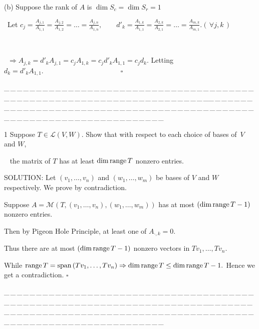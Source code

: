 \documentclass[a4paper, 11pt, UTF8]{article}
\def\range{\textup{range}\,}
\def\Spn{\textup{span}\,}
\def\Lm{\mathcal{L}}
\def\Mt{\mathcal{M}}
\begin{document}
\begin{large}
(b) Suppose the rank of $A$ is $\dim S_c=\dim S_r=1$ \par\qquad\,
Let $c_j=\displaystyle\frac{A_{j,1}}{A_{1,1}}=\frac{A_{j,2}}{A_{1,2}}=\dots=\frac{A_{j,n}}{A_{1,n}},\qquad d'_k=\frac{A_{1,k}}{A_{1,1}}=\frac{A_{2,k}}{A_{2,1}}=\dots=\frac{A_{m,k}}{A_{m,1}}$.\quad$(\,\forall j,k\,)$\par{\tiny{\,}\par}\qquad\,
$\Rightarrow A_{j,k}=d'_k A_{j,1}=c_j A_{1,k}=c_j d'_k A_{1,1}=c_j d_k.$ Letting $d_k=d'_k A_{1,1}.\qquad\qquad\qquad\qquad\qquad\quad\square$
\par
{\tiny \_\,\_\,\_\,\_\,\_\,\_\,\_\,\_\,\_\,\_\,\_\,\_\,\_\,\_\,\_\,\_\,\_\,\_\,\_\,\_\,\_\,\_\,\_\,\_\,\_\,\_\,\_\,\_\,\_\,\_\,\_\,\_\,\_\,\_\,\_\,\_\,\_\,\_\,\_\,\_\,\_\,\_\,\_\,\_\,\_\,\_\,\_\,\_\,\_\,\_\,\_\,\_\,\_\,\_\,\_\,\_\,\_\,\_\,\_\,\_\,\_\,\_\,\_\,\_\,\_\,\_\,\_\,\_\,\_\,\_\,\_\_\,\_\,\_\,\_\,\_\,\_\,\_\,\_\,\_\,\_\,\_\,\_\,\_\,\_\,\_\,\_\,\_\,\_\,\_\,\_\,\_\,\_\,\_\,\_\,\_\,\_\,\_\,\_\,\_\,\_\,\_\,\_\,\_\,\_\,\_\,\_\,\_\,\_\,\_\,\_\,\_\,\_\,\_\,\_\,\_\,\_\,\_\,\_\,\_\,\_\,\_\,\_\,\_\,\_\,\_\,\_\,\_\,\_\,\_\,\_\,\_\,\_\,\_\,\_\,\_\,\_\,\_\,\_\,\_\,\_\,\_}\par

{\timesbf\Large 1} {\timessl\Large 
Suppose $T\in\Lm(V, W)$. Show that with respect to each choice of bases of \,$V$ and $W$,}\par\,\,\,
{\timessl\Large the matrix of $T$ has at least $\dim\range T$ nonzero entries.
}\par
{\timesbf S\footnotesize{OLUTION:}} Let $(v_1,\dots,v_n)$ and $(w_1,\dots,w_m)$ be bases of $V$ and $W$ respectively. We prove by contradiction.\par\quad
Suppose $A=\Mt(T,(v_1,\dots,v_n),(w_1,\dots,w_m))$ has at most $(\dim\range T-1)$ nonzero entries.\par\quad
Then by Pigeon Hole Principle, at least one of $A_{\cdot,k}=0$.\par\quad
Thus there are at most $(\dim\range T-1)$ nonzero vectors in $Tv_1,\dots,Tv_n$.\par\quad
While $\range T=\Spn(Tv_1,\dots,Tv_n)\Rightarrow\dim\range T\leq \dim\range T-1.$ Hence we get a contradiction.$\,\,\square$
\par
{\tiny \_\,\_\,\_\,\_\,\_\,\_\,\_\,\_\,\_\,\_\,\_\,\_\,\_\,\_\,\_\,\_\,\_\,\_\,\_\,\_\,\_\,\_\,\_\,\_\,\_\,\_\,\_\,\_\,\_\,\_\,\_\,\_\,\_\,\_\,\_\,\_\,\_\,\_\,\_\,\_\,\_\,\_\,\_\,\_\,\_\,\_\,\_\,\_\,\_\,\_\,\_\,\_\,\_\,\_\,\_\,\_\,\_\,\_\,\_\,\_\,\_\,\_\,\_\,\_\,\_\,\_\,\_\,\_\,\_\,\_\,\_\_\,\_\,\_\,\_\,\_\,\_\,\_\,\_\,\_\,\_\,\_\,\_\,\_\,\_\,\_\,\_\,\_\,\_\,\_\,\_\,\_\,\_\,\_\,\_\,\_\,\_\,\_\,\_\,\_\,\_\,\_\,\_\,\_\,\_\,\_\,\_\,\_\,\_\,\_\,\_\,\_\,\_\,\_\,\_\,\_\,\_\,\_\,\_\,\_\,\_\,\_\,\_\,\_\,\_\,\_\,\_\,\_\,\_\,\_\,\_\,\_\,\_\,\_\,\_\,\_\,\_\,\_\,\_\,\_\,\_\,\_}\par


\end{large}
\end{document}
